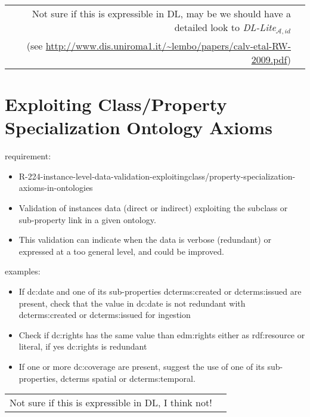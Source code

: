 \documentclass{llncs}
\newenvironment{DL}{
	\begin{center}
  \begin{tabular}{r l}

}{
  \end{tabular}
	\end{center}
}
\newcommand{\an}[1]{\todo[size=\small, color=green!40]{\textbf{Andy:} #1}}
\begin{document}
\begin{DL}
Not sure if this is expressible in DL, may be we should have a detailed look to \textit{DL-Lite}$_{\mathcal{A},id}$ \\
(see \url{http://www.dis.uniroma1.it/~lembo/papers/calv-etal-RW-2009.pdf})
\end{DL}

\an{not sure!}

\section{Exploiting Class/Property Specialization Ontology Axioms}

requirement:

\begin{itemize}
	\item R-224-instance-level-data-validation-exploitingclass/property-specialization-axioms-in-ontologies
\end{itemize}



\begin{itemize}
  \item Validation of instances data (direct or indirect) exploiting the subclass or sub-property link in a given ontology.
  \item This validation can indicate when the data is verbose (redundant) or expressed at a too general level, and could be improved.
\end{itemize}

examples:

\begin{itemize}
	\item If dc:date and one of its sub-properties dcterms:created or dcterms:issued are present, check that the value in dc:date is not redundant with dcterms:created or dcterms:issued for ingestion
  \item Check if dc:rights has the same value than edm:rights either as rdf:resource or literal, if yes dc:rights is redundant
  \item If one or more dc:coverage are present, suggest the use of one of its sub-properties, dcterms spatial or dcterms:temporal.
\end{itemize}

\begin{DL}
Not sure if this is expressible in DL, I think not!
\end{DL}

\an{not sure!}
\end{document}
